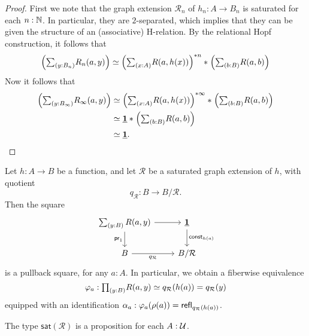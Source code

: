 \begin{proof}
First we note that the graph extension $\mathcal{R}_n$ of $h_n:A\to B_n$ is saturated for each $n:\mathbb{N}$. In particular, they are $2$-separated, which implies that they can be given the structure of an (associative) H-relation. By the relational Hopf construction, it follows that 
\begin{equation*}
\Big(\sm{y:B_{n}}R_{n}(a,y)\Big)\eqvsym \join{\Big(\sm{x:A}R(a,h(x))\Big)^{\ast n}}{\Big(\sm{b:B}R(a,b)\Big)}
\end{equation*}
Now it follows that 
\begin{align*}
\Big(\sm{y:B_{\infty}}R_{\infty}(a,y)\Big) & \eqvsym \join{\Big(\sm{x:A}R(a,h(x))\Big)^{\ast \infty}}{\Big(\sm{b:B}R(a,b)\Big)} \\
& \eqvsym \join{\unit}{\Big(\sm{b:B}R(a,b)\Big)} \\
& \eqvsym \unit.\qedhere
\end{align*}
\end{proof}

\begin{cor}
Let $h:A\to B$ be a function, and let $\mathcal{R}$ be a saturated graph extension of $h$, with quotient
\begin{equation*}
q_{\mathcal{R}}:B\to B/\mathcal{R}.
\end{equation*}
Then the square
\begin{equation*}
\begin{tikzcd}
\sm{y:B}R(a,y) \arrow[r] \arrow[d,swap,"\proj 1"] & \unit \arrow[d,"\mathsf{const}_{h(a)}"] \\
B \arrow[r,swap,"q_{\mathcal{R}}"] & B/\mathcal{R}
\end{tikzcd}
\end{equation*}
is a pullback square, for any $a:A$. In particular, we obtain a fiberwise equivalence
\begin{equation*}
\varphi_{a} : \prd{y:B} R(a,y) \eqvsym q_{\mathcal{R}}(h(a))=q_{\mathcal{R}}(y)
\end{equation*}
equipped with an identification $\alpha_a:\varphi_a(\rho(a))=\mathsf{refl}_{q_{\mathcal{R}}(h(a))}$.
\end{cor}

\begin{prp}\label{lem:sat_prop}
The type $\mathsf{sat}(\mathcal{R})$ is a proposition for each $A:\mathcal{U}$.
\end{prp}

